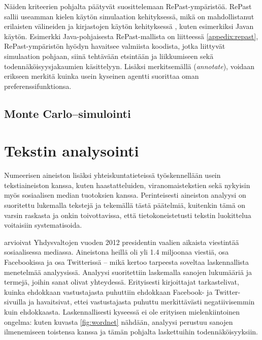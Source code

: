 \documentclass[finnish,gradu,twoside,12pt]{tktltiki}
\begin{document}
{Näiden kriteerien pohjalta \citet{Tobias2004} päätyvät suosittelemaan RePast-ympäristöä. RePast sallii useamman kielen käytön simulaation kehityksessä, mikä on mahdollistanut erilaisten välineiden ja kirjastojen käytön kehityksessä \cite{North2006}, kuten esimerkiksi Javan käytön. Esimerkki Java-pohjaisesta RePast-mallista on liitteessä \ref{appedix:repast}, RePast-ympäristön hyödyn havaitsee valmiista koodista, jotka liittyvät simulaation pohjaan, siinä tehtävään etsintään ja liikkumiseen sekä todennäköisyysjakaumien käsittelyyn. Lisäksi merkitsemällä (\textit{annotate}), voidaan erikseen merkitä kuinka usein kyseinen agentti suorittaa oman preferenssifunktionsa.

\subsection{Monte Carlo--simulointi}


\section{Tekstin analysointi}
\label{sec:textanalysis}

Numeerisen aineiston lisäksi yhteiskuntatieteissä työskennellään usein tekstiaineiston kanssa, kuten haastatteluiden, viranomaistekstien sekä nykyisin myös sosiaalisen median tuotoksien kanssa. Perinteisesti aineiston analyysi on suoritettu lukemalla tekstejä ja tekemällä tästä päätelmiä, kuitenkin tämä on varsin raskasta ja onkin toivottavissa, että tietokoneistetusti tekstin luokittelua voitaisiin systematisoida.

\citet{groshek2013public} arvioivat Yhdysvaltojen vuoden 2012 presidentin vaalien aikaista viestintää sosiaalisessa mediassa. Aineistona heillä oli yli 1.4 miljoonaa viestiä, osa Facebookissa ja osa Twitterissä -- mikä kertoo tarpeesta soveltaa laskennallista menetelmää analyysissä. Analyysi suoritettiin laskemalla sanojen lukumääriä ja termejä, joihin sanat olivat yhteydessä. Erityisesti kirjoittajat tarkastelivat, kuinka ehdokkaan vastustajasta puhuttiin ehdokkaan Facebook- ja Twitter-sivuilla ja havaitsivat, ettei vastustajasta puhuttu merkittävästi negatiivisemmin kuin ehdokkaasta. Laskennallisesti kyseessä ei ole erityisen mielenkiintoinen ongelma: kuten kuvasta \ref{fig:wordnet} nähdään, analyysi perustuu sanojen ilmenemiseen toistensa kanssa ja tämän pohjalta laskettuihin todennäköisyyksiin.

}
\end{document}
